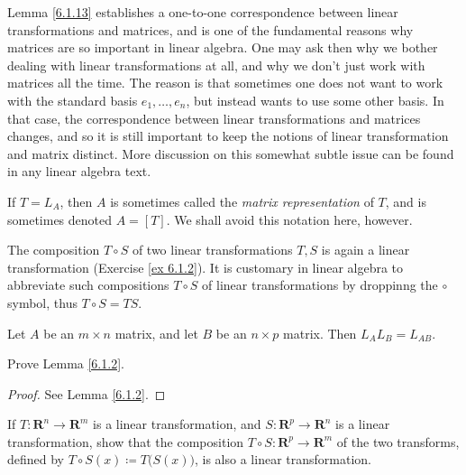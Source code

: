 \begin{remark}\label{6.1.14}
    Lemma \ref{6.1.13} establishes a one-to-one correspondence between linear transformations and matrices, and is one of the fundamental reasons why matrices are so important in linear algebra.
    One may ask then why we bother dealing with linear transformations at all, and why we don't just work with matrices all the time.
    The reason is that sometimes one does not want to work with the standard basis \(e_1, \dots, e_n\), but instead wants to use some other basis.
    In that case, the correspondence between linear transformations and matrices changes, and so it is still important to keep the notions of linear transformation and matrix distinct.
    More discussion on this somewhat subtle issue can be found in any linear algebra text.
\end{remark}

\begin{remark}\label{6.1.15}
    If \(T = L_A\), then \(A\) is sometimes called the \emph{matrix representation} of \(T\), and is sometimes denoted \(A = [T]\).
    We shall avoid this notation here, however.
\end{remark}

\begin{note}
    The composition \(T \circ S\) of two linear transformations \(T, S\) is again a linear transformation (Exercise \ref{ex 6.1.2}).
    It is customary in linear algebra to abbreviate such compositions \(T \circ S\) of linear transformations by droppinng the \(\circ\) symbol, thus \(T \circ S = TS\).
\end{note}

\begin{lemma}\label{6.1.16}
    Let \(A\) be an \(m \times n\) matrix, and let \(B\) be an \(n \times p\) matrix.
    Then \(L_A L_B = L_{AB}\).
\end{lemma}

\exercisesection

\begin{exercise}\label{ex 6.1.1}
    Prove Lemma \ref{6.1.2}.
\end{exercise}

\begin{proof}
    See Lemma \ref{6.1.2}.
\end{proof}

\begin{exercise}\label{ex 6.1.2}
    If \(T : \mathbf{R}^n \to \mathbf{R}^m\) is a linear transformation, and \(S : \mathbf{R}^p \to \mathbf{R}^n\) is a linear transformation, show that the composition \(T \circ S : \mathbf{R}^p \to \mathbf{R}^m\) of the two transforms, defined by \(T \circ S(x) \coloneqq T\big(S(x)\big)\), is also a linear transformation.
\end{exercise}

